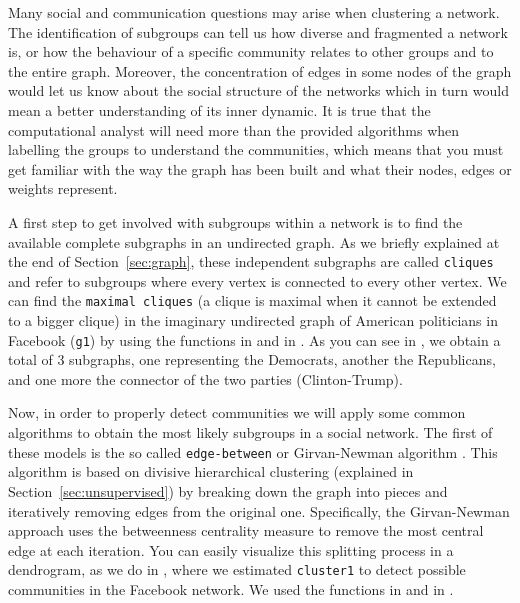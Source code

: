 Many social and communication questions may arise when clustering a network. The identification of subgroups can tell us how diverse and fragmented a network is, or how the behaviour of a specific community relates to other groups and to the entire graph. Moreover, the concentration of edges in some nodes of the graph would let us know about the social structure of the networks which in turn would mean a better understanding of its inner dynamic.  It is true that the computational analyst will need more than the provided algorithms when labelling the groups to understand the communities, which means that you must get familiar with the way the graph has been built and what their nodes, edges or weights represent.

A first step to get involved with subgroups within a network is to find the available complete subgraphs in an undirected graph. As we briefly explained at the end of Section~\ref{sec:graph}, these independent subgraphs are called \texttt{cliques} and refer to subgroups where every vertex is connected to every other vertex. We can find the \texttt{maximal cliques} (a clique is maximal when it cannot be extended to a  bigger clique) in the imaginary undirected graph of American politicians in Facebook (\texttt{g1}) by using the functions  in  \citep{eppstein2010listing} and  in  \citep{cazals2008note}. As you can see in , we obtain a total of 3 subgraphs, one representing the Democrats, another the Republicans, and one more the connector of the two parties (Clinton-Trump).


Now, in order to properly detect communities we will apply some common algorithms to obtain the most likely subgroups in a social network. The first of these models is the so called \texttt{edge-between} or Girvan-Newman algorithm \citep{newman2004finding}. This algorithm is based on divisive hierarchical clustering (explained in Section~\ref{sec:unsupervised}) by breaking down the graph into pieces and iteratively removing edges from the original one. Specifically,  the Girvan-Newman approach uses the betweenness centrality measure to remove the most central edge at each iteration. You can easily visualize this splitting process in a dendrogram, as we do in , where we estimated \texttt{cluster1} to detect possible communities in the Facebook network. We used the functions  in  and  in .

